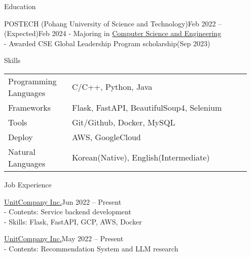 \documentclass{resume}
\begin{document}
\begin{rSection}{Education}
    \begin{rSubsection}{POSTECH (Pohang University of Science and Technology)}{Feb 2022 -- (Expected)Feb 2024}
        - Majoring in \href{https://cse.postech.ac.kr}{Computer Science and Engineering} \\
        - Awarded CSE Global Leadership Program scholarship(Sep 2023)
    \end{rSubsection}
\end{rSection}

\begin{rSection}{Skills}
    \begin{tabular}{@{}p{0.25\linewidth}p{0.7\linewidth}}
        Programming Languages
            & C/C++, Python, Java \\ [0.3em]
        Frameworks
            & Flask, FastAPI, BeautifulSoup4, Selenium \\ [0.3em]
        Tools
            & Git/Github, Docker, MySQL \\ [0.3em]
        Deploy
            & AWS, GoogleCloud \\ [0.3em]
        Natural Languages
            & Korean(Native), English(Intermediate)
    \end{tabular}
\end{rSection}

\begin{rSection}{Job Experience}
    \begin{rSubsection}{\href{https://unitcompany.co.kr}{UnitCompany Inc.}}{Jun 2022 -- Present}
        {\bfseries{}} \\
        - Contents: Service backend development \\
        - Skills: Flask, FastAPI, GCP, AWS, Docker
    \end{rSubsection}
    \begin{rSubsection}{\href{https://unitcompany.co.kr}{UnitCompany Inc.}}{May 2022 -- Present}
        {\bfseries{}} \\
        - Contents: Recommendation System and LLM research
    \end{rSubsection}
\end{rSection}
\end{document}
